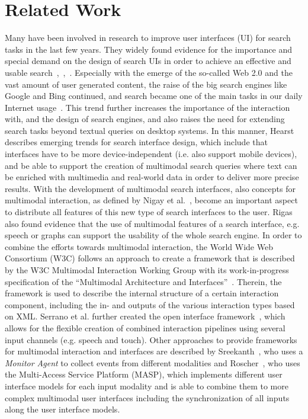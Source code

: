 \documentclass[runningheads,a4paper]{llncs} \usepackage[utf8]{inputenc}
\begin{document}
\section{Related Work} \label{sec:related}
Many have been involved in research to improve user interfaces (UI) for search tasks in the last few years. They widely found evidence for the importance and special demand on the design of search UIs in order to achieve an effective and usable search~\cite{hearst2009},~\cite{quesenbery2008},~\cite{huangTsaiChang2009}. Especially with the emerge of the so-called Web 2.0 and the vast amount of user generated content, the raise of the big search engines like Google and Bing continued, and search became one of the main tasks in our daily Internet usage~\cite{quesenbergWeb2008}. This trend further increases the importance of the interaction with, and the design of search engines, and also raises the need for extending search tasks beyond textual queries on desktop systems. In this manner, Hearst~\cite{hearst2011} describes emerging trends for search interface design, which include that interfaces have to be more device-independent (i.e. also support mobile devices), and be able to support the creation of multimodal search queries where text can be enriched with multimedia and real-world data in order to deliver more precise results. With the development of multimodal search interfaces, also concepts for multimodal interaction, as defined by Nigay et al.~\cite{nigay}, become an important aspect to distribute all features of this new type of search interfaces to the user. Rigas~\cite{rigas2007} also found evidence that the use of multimodal features of a search interface, e.g. speech or graphs can support the usability of the whole search engine. In order to combine the efforts towards multimodal interaction, the World Wide Web Consortium (W3C) follows an approach to create a framework that is described by the W3C Multimodal Interaction Working Group with its work-in-progress specification of the ``Multimodal Architecture and Interfaces''~\cite{w3cMMI}. Therein, the framework is used to describe the internal structure of a certain interaction component, including the in- and outputs of the various interaction types based on XML. Serrano et al. further created the open interface framework~\cite{openinterface}, which allows for the flexible creation of combined interaction pipelines using several input channels (e.g. speech and touch). Other approaches to provide frameworks for multimodal interaction and interfaces are described by Sreekanth~\cite{sreekanth}, who uses a \textit{Monitor Agent} to collect events from different modalities and Roscher~\cite{roscher}, who uses the Multi-Access Service Platform (MASP), which implements different user interface models for each input modality and is able to combine them to more complex multimodal user interfaces including the synchronization of all inputs along the user interface models.
\end{document}
